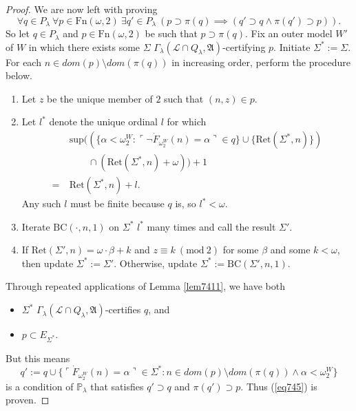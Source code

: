 \documentclass[12pt, twoside]{memoir}
\numberwithin{equation}{section}
\theoremstyle{definition}
\theoremstyle{remark}
\theoremstyle{definition}
\theoremstyle{definition}
\theoremstyle{definition}
\theoremstyle{remark}
\begin{document}
\begin{proof}
We are now left with proving
\begin{equation}\label{eq745}
    \forall q \in P_{\lambda} \ \forall p \in \mathrm{Fn}(\omega, 2) \ \exists q' \in P_{\lambda} \ (p \supset \pi(q) \implies (q' \supset q \wedge \pi(q') \supset p)) \text{.}
\end{equation}
So let $q \in P_{\lambda}$ and $p \in \mathrm{Fn}(\omega, 2)$ be such that $p \supset \pi(q)$. Fix an outer model $W'$ of $W$ in which there exists some $\Sigma$ $\Gamma_{\lambda} (\mathcal{L} \cap Q_{\lambda}, \mathfrak{A})$-certifying $p$. Initiate $\Sigma^* := \Sigma$. For each $n \in dom(p) \setminus dom(\pi(q))$ in increasing order, perform the procedure below.
\begin{enumerate}[label=(\Alph*)]
    \item Let $z$ be the unique member of $2$ such that $(n, z) \in p$.
    \item Let $l^*$ denote the unique ordinal $l$ for which
        \begin{align*}
            & \mathrm{sup}((\{\alpha < \omega_2^W: \ulcorner \neg \dot{F}_{\omega_2^W}(n) = \alpha \urcorner \in q\} \cup \{\mathrm{Ret}(\Sigma^*, n)\}) \\
            & \mspace{35mu} \cap (\mathrm{Ret}(\Sigma^*, n) + \omega)) + 1 \\
            = \ & \mathrm{Ret}(\Sigma^*, n) + l \text{.}
        \end{align*}
    Any such $l$ must be finite because $q$ is, so $l^* < \omega$.
    \item Iterate $\mathrm{BC}(\cdot, n, 1)$ on $\Sigma^*$ $l^*$ many times and call the result $\Sigma'$.
    \item If $\mathrm{Ret}(\Sigma', n) = \omega \cdot \beta + k$ and $z \equiv k \ (\mathrm{mod} \ 2)$ for some $\beta$ and some $k < \omega$, then update $\Sigma^* := \Sigma'$. Otherwise, update $\Sigma^* := \mathrm{BC}(\Sigma', n, 1)$.
\end{enumerate}
Through repeated applications of Lemma \ref{lem7411}, we have both
\begin{itemize}
    \item $\Sigma^*$ $\Gamma_{\lambda} (\mathcal{L} \cap Q_{\lambda}, \mathfrak{A})$-certifies $q$, and
    \item $p \subset E_{\Sigma^*}$.
\end{itemize}
But this means 
\begin{equation*}
    q' := q \cup \{\ulcorner \dot{F}_{\omega_2^W}(n) = \alpha \urcorner \in \Sigma^* : n \in dom(p) \setminus dom(\pi(q)) \wedge \alpha < \omega_2^W\}
\end{equation*}
is a condition of $\mathbb{P}_{\lambda}$ that satisfies $q' \supset q$ and $\pi(q') \supset p$. Thus (\ref{eq745}) is proven.
\end{proof}
\end{document}
